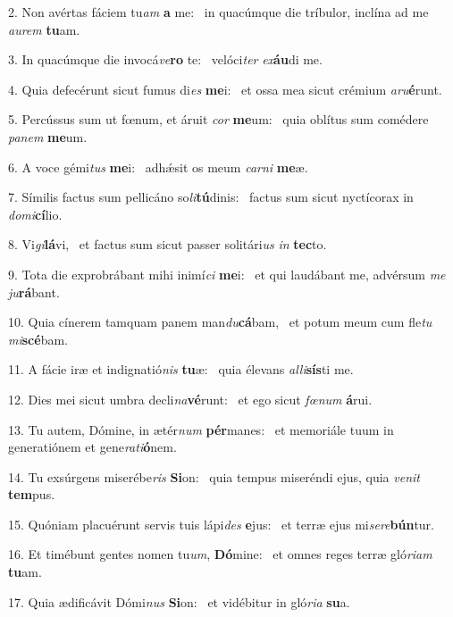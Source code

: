 2. Non avértas fáciem tu\textit{am} \textbf{a} me: \ast\  in quacúmque die tríbulor, inclína ad me \textit{au}\textit{rem} \textbf{tu}am.\

3. In quacúmque die invocá\textit{ve}\textbf{ro} te: \ast\  velóci\textit{ter} \textit{ex}\textbf{áu}di me.\

4. Quia defecérunt sicut fumus di\textit{es} \textbf{me}i: \ast\  et ossa mea sicut crémium \textit{a}\textit{ru}\textbf{é}runt.\

5. Percússus sum ut fœnum, et áruit \textit{cor} \textbf{me}um: \ast\  quia oblítus sum comédere \textit{pa}\textit{nem} \textbf{me}um.\

6. A voce gémi\textit{tus} \textbf{me}i: \ast\  adhǽsit os meum \textit{car}\textit{ni} \textbf{me}æ.\

7. Símilis factus sum pellicáno so\textit{li}\textbf{tú}dinis: \ast\  factus sum sicut nyctícorax in \textit{do}\textit{mi}\textbf{cí}lio.\

8. Vi\textit{gi}\textbf{lá}vi, \ast\  et factus sum sicut passer solitári\textit{us} \textit{in} \textbf{tec}to.\

9. Tota die exprobrábant mihi inimí\textit{ci} \textbf{me}i: \ast\  et qui laudábant me, advérsum \textit{me} \textit{ju}\textbf{rá}bant.\

10. Quia cínerem tamquam panem man\textit{du}\textbf{cá}bam, \ast\  et potum meum cum fle\textit{tu} \textit{mi}\textbf{scé}bam.\

11. A fácie iræ et indignatió\textit{nis} \textbf{tu}æ: \ast\  quia élevans \textit{al}\textit{li}\textbf{sís}ti me.\

12. Dies mei sicut umbra decli\textit{na}\textbf{vé}runt: \ast\  et ego sicut \textit{fœ}\textit{num} \textbf{á}rui.\

13. Tu autem, Dómine, in ætér\textit{num} \textbf{pér}manes: \ast\  et memoriále tuum in generatiónem et gene\textit{ra}\textit{ti}\textbf{ó}nem.\

14. Tu exsúrgens miserébe\textit{ris} \textbf{Si}on: \ast\  quia tempus miseréndi ejus, quia \textit{ve}\textit{nit} \textbf{tem}pus.\

15. Quóniam placuérunt servis tuis lápi\textit{des} \textbf{e}jus: \ast\  et terræ ejus mi\textit{se}\textit{re}\textbf{bún}tur.\

16. Et timébunt gentes nomen tu\textit{um}, \textbf{Dó}mine: \ast\  et omnes reges terræ gló\textit{ri}\textit{am} \textbf{tu}am.\

17. Quia ædificávit Dómi\textit{nus} \textbf{Si}on: \ast\  et vidébitur in gló\textit{ri}\textit{a} \textbf{su}a.\


